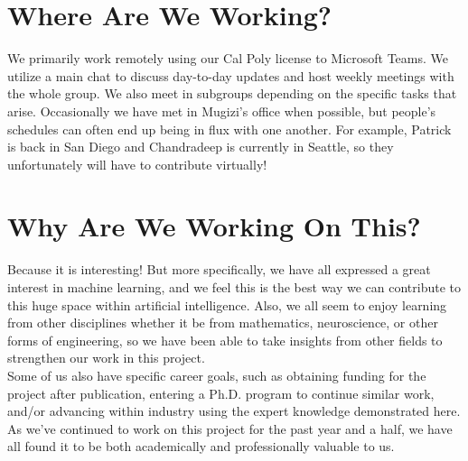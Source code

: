 \documentclass{article}
\begin{document}
\section*{Where Are We Working?}

\begin{figure}
    \centering
    {%
	   \setlength{\fboxsep}{0pt}%
	   \setlength{\fboxrule}{0pt}%
	 }%
\end{figure} \hfill

We primarily work remotely using our Cal Poly license to Microsoft Teams. We utilize a main chat to discuss day-to-day updates and host weekly meetings with the whole group. We also meet in subgroups depending on the specific tasks that arise. Occasionally we have met in Mugizi's office when possible, but people's schedules can often end up being in flux with one another. For example, Patrick is back in San Diego and Chandradeep is currently in Seattle, so they unfortunately will have to contribute virtually!

\section*{Why Are We Working On This?}

\hfill

Because it is interesting! But more specifically, we have all expressed a great interest in machine learning, and we feel this is the best way we can contribute to this huge space within artificial intelligence. Also, we all seem to enjoy learning from other disciplines whether it be from mathematics, neuroscience, or other forms of engineering, so we have been able to take insights from other fields to strengthen our work in this project. \\

Some of us also have specific career goals, such as obtaining funding for the project after publication, entering a Ph.D. program to continue similar work, and/or advancing within industry using the expert knowledge demonstrated here. As we've continued to work on this project for the past year and a half, we have all found it to be both academically and professionally valuable to us.
\end{document}
